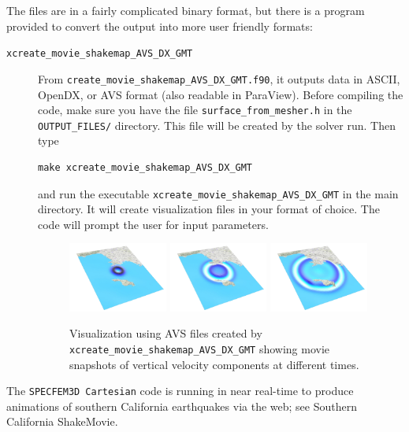 The files are in a fairly complicated binary format, but there is
a program provided to convert the output into more user friendly formats:
\begin{description}
\item [{\texttt{xcreate\_movie\_shakemap\_AVS\_DX\_GMT}}]
From \texttt{create\_movie\_shakemap\_AVS\_DX\_GMT.f90},
it outputs data in ASCII, OpenDX, or AVS format (also readable in
ParaView). Before compiling the code, make sure you have the file
\texttt{surface\_from\_mesher.h} in the \texttt{OUTPUT\_FILES/} directory.
This file will be created by the solver run. Then type

{\footnotesize
\begin{verbatim}
make xcreate_movie_shakemap_AVS_DX_GMT
\end{verbatim}
}
and run the executable \texttt{xcreate\_movie\_shakemap\_AVS\_DX\_GMT}
in the main directory. It will create visualization files
in your format of choice. The code will prompt the user for input
parameters.


\begin{figure}[htbp]
\begin{centering}
\includegraphics[width=0.32\textwidth]{figures/movie_surf_1.jpg}
\includegraphics[width=0.32\textwidth]{figures/movie_surf_2.jpg}
\includegraphics[width=0.32\textwidth]{figures/movie_surf_3.jpg}
\par
\end{centering}
\caption{Visualization using AVS files created by \texttt{xcreate\_movie\_shakemap\_AVS\_DX\_GMT}
showing movie snapshots of vertical velocity components at different times.}
\label{fig:movie.surf}
\end{figure}


\end{description}
The \texttt{SPECFEM3D Cartesian} code is running in near real-time
to produce animations of southern California earthquakes via the web;
see Southern California ShakeMovie\textregistered{}.


